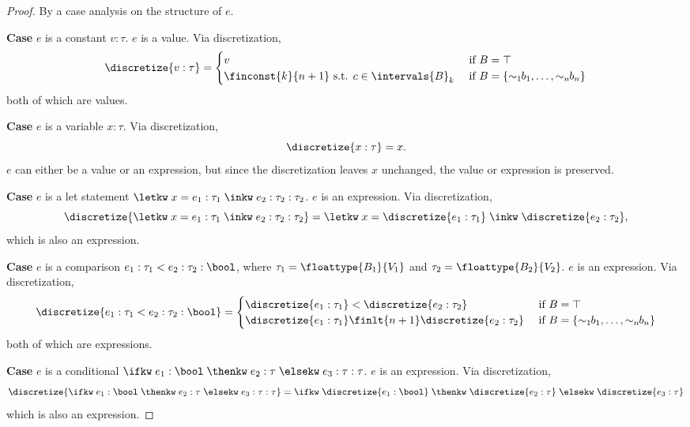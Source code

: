 \begin{proof}
	By a case analysis on the structure of $e$. 

	\textbf{Case} $e$ is a constant $v : \tau$. $e$ is a value. Via discretization,
	\[
		\discretize{v : \tau} = \begin{cases}
			v &\text{ if } B = \top \\
			\finconst{k}{n+1} \text{ s.t. } c \in \intervals{B}_k &\text{ if } B = \{\sim_1\!\!b_1, \ldots, \sim_n\!\!b_n\}
		\end{cases}
	\]
	both of which are values.
	
	\textbf{Case} $e$ is a variable $x : \tau$. Via discretization, \[
		\discretize{x : \tau} = x.
	\]
	$e$ can either be a value or an expression, but since the discretization leaves $x$ unchanged, the value or expression is preserved.

	\textbf{Case} $e$ is a let statement $\letkw \; x = e_1 : \tau_1 \; \inkw \; e_2 : \tau_2 : \tau_2$. $e$ is an expression. Via discretization,
	\[
	\discretize{\letkw \; x = e_1 : \tau_1 \; \inkw \; e_2 : \tau_2 : \tau_2} = 
	\letkw \; x = \discretize{e_1 : \tau_1} \; \inkw \; \discretize{e_2 : \tau_2},
	\]
	which is also an expression.

	\textbf{Case} $e$ is a comparison $e_1 : \tau_1 < e_2 : \tau_2 : \bool$, where $\tau_1 = \floattype{B_1}{V_1}$ and $\tau_2 = \floattype{B_2}{V_2}$. $e$ is an expression. Via discretization,
	\[
	\discretize{e_1 : \tau_1 < e_2 : \tau_2 : \bool} = \begin{cases}
		\discretize{e_1 : \tau_1} < \discretize{e_2 : \tau_2} &\text{ if } B = \top \\
		\discretize{e_1 : \tau_1} \finlt{n+1} \discretize{e_2 : \tau_2} &\text{ if } B = \{\sim_1\!\!b_1, \ldots, \sim_n\!\!b_n\} \\
	\end{cases}
	\]
	both of which are expressions.

	\textbf{Case} $e$ is a conditional $\ifkw \; e_1 : \bool \; \thenkw \; e_2 : \tau \; \elsekw \; e_3 : \tau : \tau$. $e$ is an expression. Via discretization,
	\[
		\discretize{\ifkw \; e_1 : \bool \; \thenkw \; e_2 : \tau \; \elsekw \; e_3 : \tau : \tau} = \ifkw \; \discretize{e_1 : \bool} \; \thenkw \; \discretize{e_2 : \tau} \; \elsekw \; \discretize{e_3 : \tau}
	\]
	which is also an expression.


\end{proof}
